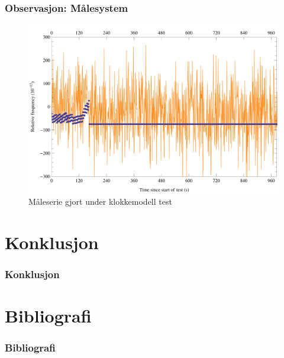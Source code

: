 \documentclass[xcolor=table]{beamer}
\begin{document}
\begin{frame}
\frametitle{Observasjon: Målesystem}
      \begin{figure}
        \includegraphics[scale=0.70]{thesis/graphics/20161024-test2-telemetry-and-cnt91-combined-1-2.png}
        \caption{Måleserie gjort under klokkemodell test}
      \end{figure}
\end{frame}

\section{Konklusjon}
\begin{frame}
  \frametitle{Konklusjon}
\end{frame}

\section{Bibliografi}
\begin{frame}[allowframebreaks]%
  \frametitle{Bibliografi}
  \printbibliography[heading=bibintoc]
\end{frame}
\end{document}
